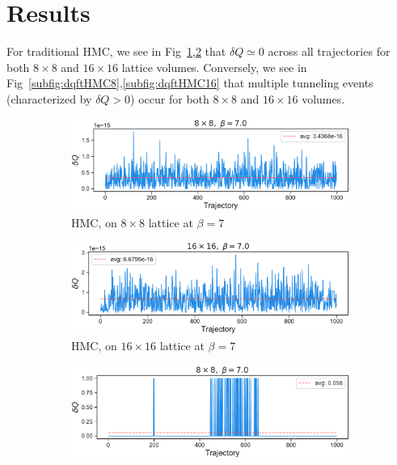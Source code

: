 \documentclass[a4paper,11pt]{article}
\begin{document}
\section{\label{sec:results}Results}
%
For traditional HMC, we see in Fig~\ref{subfig:dqHMC8},\ref{subfig:dqHMC16}
that \(\delta Q \simeq 0\) across all trajectories for both \(8\times 8\) and
\(16\times 16\) lattice volumes.
%
Conversely, we see in Fig~\ref{subfig:dqftHMC8},\ref{subfig:dqftHMC16} that
multiple tunneling events (characterized by \(\delta Q > 0\)) occur for both
\(8 \times 8\) and \(16 \times 16\) volumes.
%
\begin{figure}[htpb]
    \centering
    \begin{subfigure}[b]{0.49\textwidth}
        \includegraphics[width=\textwidth]{assets/dqHMC_8x8_beta7.pdf}
        \caption{\label{subfig:dqHMC8}HMC, on \(8 \times 8\) lattice at
            \(\beta = 7\)}
    \end{subfigure}
    \hfill
    \begin{subfigure}[b]{0.49\textwidth}
        \includegraphics[width=\textwidth]{assets/dqHMC_16x16_beta7.pdf}
        \caption{\label{subfig:dqHMC16}HMC, on \(16 \times 16\) lattice at
        \(\beta = 7\)}
    \end{subfigure}
    \begin{subfigure}[b]{0.49\textwidth}
        \includegraphics[width=\textwidth]{assets/dqftHMC_8x8_beta7.pdf}

\end{subfigure}
\end{figure}
\end{document}
